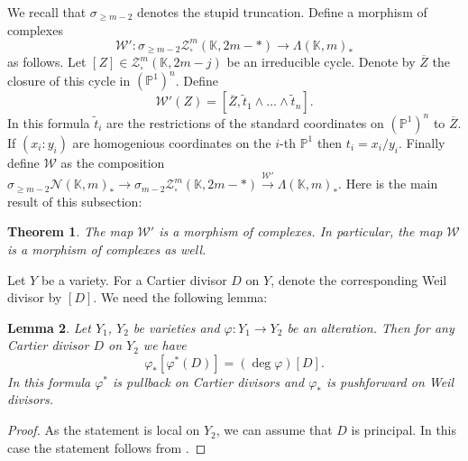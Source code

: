 \documentclass[12pt]{extarticle}
\newtheorem{theorem}{Theorem}[section]
\newtheorem{lemma}[theorem]{Lemma}
\def\mb{\mathbb}
\def\mc{\mathcal}
\def\L{\Lambda}
\def\k{\mb K}
\def\ph{\varphi}
\def\wt{\widetilde}
\renewcommand{\P}{{\mb P}}
\begin{document}
We recall that $\sigma_{\geq m-2}$ denotes the stupid truncation. Define a morphism of complexes $$\mc W'\colon \sigma_{\geq m-2}\mc Z_\square^m(\k,2m-*)\to\L(\k,m)_*$$ as follows. Let $[Z]\in  \mc Z_\square^m(\k,2m-j)$ be an irreducible cycle. Denote by $\overline Z$ the closure of this cycle in $(\P^1)^n$. Define
$$\mc W'(Z)=[\overline Z,  \wt t_1\wedge\dots\wedge \wt t_n].$$
In this formula $\wt t_i$ are the restrictions of the standard coordinates on $(\P^1)^n$ to $\overline Z$. If $(x_i:y_i)$ are homogenious coordinates on the $i$-th $\P^1$ then $t_i=x_i/y_i$. Finally define $\mc W$ as the composition $\sigma_{\geq m-2}\mc N(\k,m)_*\to \sigma_{m-2}\mc Z_\square^m(\k,2m-*)\xrightarrow{\mc W'}\L(\k,m)_*$. Here is the main result of this subsection:

\begin{theorem}
\label{th:W(m)_is_morphism}
    The map $\mc W'$ is a morphism of complexes. In particular, the map $\mc W$ is a morphism of complexes as well.
\end{theorem}


Let $Y$ be a variety. For a Cartier divisor $D$ on $Y$, denote the corresponding Weil divisor by $[D]$. 
We need the following lemma:

\begin{lemma}
\label{lemma:degree_of_morphism}
    Let $Y_1$, $Y_2$ be varieties and $\varphi\colon Y_1\to Y_2$ be an alteration. Then for any Cartier divisor $D$ on $Y_2$ we have
    $$\varphi_*[\varphi^*(D)]=(\deg\varphi)[D].$$ 
    In this formula $\ph^*$ is pullback on Cartier divisors and $\ph_*$ is pushforward on Weil divisors.
\end{lemma}

\begin{proof}
    As the statement is local on $Y_2$, we can assume that $D$ is principal. In this case the statement follows from \cite[Proposition 1.4]{fulton2013intersection}.
\end{proof}
\end{document}
